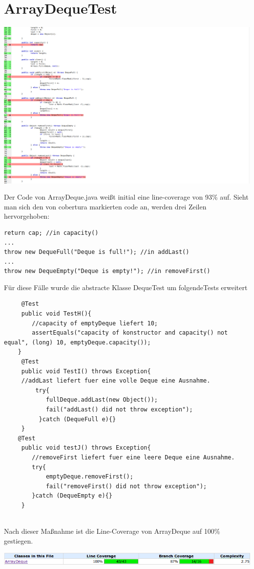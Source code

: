 \documentclass[a4paper,11pt]{scrartcl}
\begin{document}
\section{ArrayDequeTest}
\begin{center}
\includegraphics[scale=0.3]{arraydeque}

\end{center}
Der Code von ArrayDeque.java weißt initial eine line-coverage von 93\% auf. Sieht man sich den von cobertura markierten code an, werden drei Zeilen hervorgehoben:
\begin{center}
\begin{lstlisting}
return cap; //in capacity()
...
throw new DequeFull("Deque is full!"); //in addLast()
...
throw new DequeEmpty("Deque is empty!"); //in removeFirst()
\end{lstlisting} 
\end{center}
Für diese Fälle wurde die abstracte Klasse DequeTest um folgendeTests erweitert
\begin{lstlisting}
     @Test 
     public void TestH(){
        //capacity of emptyDeque liefert 10;
        assertEquals("capacity of konstructor and capacity() not equal", (long) 10, emptyDeque.capacity());
    }        
     @Test
     public void TestI() throws Exception{
     //addLast liefert fuer eine volle Deque eine Ausnahme.
      	 try{
       	    fullDeque.addLast(new Object());
       	    fail("addLast() did not throw exception");
      	  }catch (DequeFull e){}
   	 }
    @Test
   	 public void testJ() throws Exception{
     	//removeFirst liefert fuer eine leere Deque eine Ausnahme.
        try{
            emptyDeque.removeFirst();
            fail("removeFirst() did not throw exception");
        }catch (DequeEmpty e){}
     }
 

\end{lstlisting}
Nach dieser Maßnahme ist die Line-Coverage von ArrayDeque auf 100\% gestiegen.
\begin{center}
\includegraphics[scale=0.5]{ArrayDeque100}
\end{center}
\end{document}
